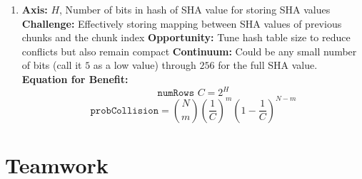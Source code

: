 \documentclass{article}
\begin{document}
\begin{enumerate}
\begin{enumerate}
\item%

\textbf{Axis:} $H$, Number of bits in hash of SHA value for storing SHA values
\newline
\textbf{Challenge:} Effectively storing mapping between SHA values of previous chunks and the chunk index
\newline
\textbf{Opportunity:} Tune hash table size to reduce conflicts but also remain compact
\newline
\textbf{Continuum:} Could be any small number of bits (call it $5$ as a low value) through $256$ for the full SHA value.
\newline
\textbf{Equation for Benefit:}
\[
\texttt{numRows }C=2^H
\]
\[
\texttt{probCollision}={N \choose m}\left(\frac{1}{C}\right)^m \left(1 - \frac{1}{C}\right)^{N-m}
\]

\end{enumerate}

\end{enumerate}


\section{Teamwork}


\begin{appendices}
%
%
%


\end{appendices}
\end{document}
